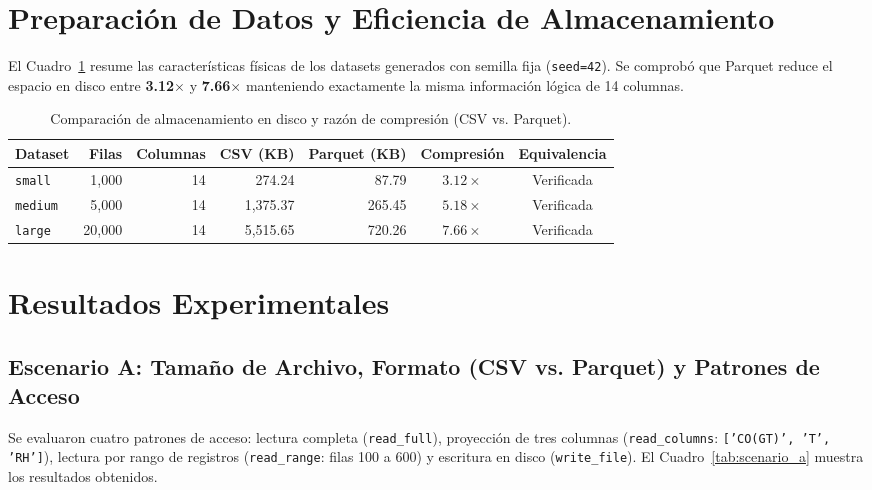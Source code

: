\documentclass[11pt,a4paper]{article}
\begin{document}
\section{Preparación de Datos y Eficiencia de Almacenamiento}

El Cuadro~\ref{tab:datasets} resume las características físicas de los datasets generados con semilla fija (\texttt{seed=42}). Se comprobó que Parquet reduce el espacio en disco entre \textbf{3.12$\times$} y \textbf{7.66$\times$} manteniendo exactamente la misma información lógica de 14 columnas.

\begin{table}[H]
\centering
\caption{Comparación de almacenamiento en disco y razón de compresión (CSV vs. Parquet).}
\label{tab:datasets}
\begin{tabular}{lrrrrcc}
\toprule
\textbf{Dataset} & \textbf{Filas} & \textbf{Columnas} & \textbf{CSV (KB)} & \textbf{Parquet (KB)} & \textbf{Compresión} & \textbf{Equivalencia} \\
\midrule
\texttt{small}  & 1,000  & 14 & 274.24  & 87.79  & $3.12\times$ & Verificada \\
\texttt{medium} & 5,000  & 14 & 1,375.37 & 265.45 & $5.18\times$ & Verificada \\
\texttt{large}  & 20,000 & 14 & 5,515.65 & 720.26 & $7.66\times$ & Verificada \\
\bottomrule
\end{tabular}
\end{table}

\section{Resultados Experimentales}

\subsection{Escenario A: Tamaño de Archivo, Formato (CSV vs. Parquet) y Patrones de Acceso}
Se evaluaron cuatro patrones de acceso: lectura completa (\texttt{read\_full}), proyección de tres columnas (\texttt{read\_columns}: \texttt{['CO(GT)', 'T', 'RH']}), lectura por rango de registros (\texttt{read\_range}: filas 100 a 600) y escritura en disco (\texttt{write\_file}). El Cuadro~\ref{tab:scenario_a} muestra los resultados obtenidos.
\end{document}
